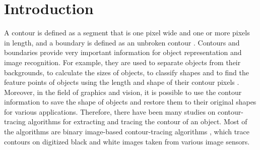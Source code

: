 \documentclass[sensors,article,accept,moreauthors,pdftex,10pt,a4paper]{mdpi}
\begin{document}

\section{Introduction}


A contour is defined as a segment that is one pixel wide and one or more pixels in length, and a boundary is defined as an unbroken contour \cite{Mcqueen2004Contour}. Contours and boundaries provide very important information for object representation and image recognition. For example, they are used to separate objects from their backgrounds, to calculate the sizes of objects, to classify shapes and to find the feature points of objects using the length and shape of their contour pixels \cite{Pratt????Digital,Gose1996Pattern}. Moreover, in the field of graphics and vision, it is possible to use the contour information to save the shape of objects and restore them to their original shapes for various applications. Therefore, there have been many studies on contour-tracing algorithms for extracting and tracing the contour of an object. Most of the algorithms are binary image-based contour-tracing algorithms \cite{Pitas2000Digital,Gose1996Pattern,Das1990Bivariate,Papert1973Uses,Cheong2006Improved,Reddy2012Evaluation,Pavlidis2012Algorithms}, which trace contours on digitized black and white images taken from various image sensors.
\end{document}
